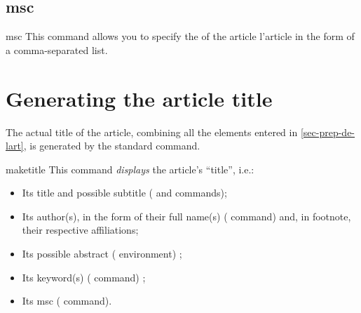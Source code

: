 \documentclass[english,nolocaltoc]{nwejmart}
\newtheorem[style=definition]{fact}
\newtheorem[title-plural=Criteria]{criterion}
\newtheorem[title=random experiment]{rexp}
\begin{document}
\begin{bodycode}[listing options={deletekeywords={[5]keywords}}]
\end{bodycode}

\subsection{\texorpdfstring{\acrfull{msc}}{MSC}}

\begin{docCommand}[doc description=\mandatory]{msc}{}
  This command allows you to specify the  of the article
  l'article in the form of a comma-separated list.
\end{docCommand}

\section{Generating the article title}
\label{sec-creation-du-titre}

The actual title of the article, combining all the elements entered in
\vref{sec-prep-de-lart}, is generated by the standard
 command.

\begin{docCommand}[doc description=\mandatory]{maketitle}{}
  This command  \emph{displays} the article's \enquote{title}, i.e.:
  \begin{itemize}
  \item Its title and possible subtitle ( and
     commands);
  \item Its author(s),  in the form of their full name(s)
    ( command) and, in footnote, their respective affiliations;
  \item Its possible abstract ( environment) ;
  \item Its keyword(s) ( command) ;
  \item Its \acrshort{msc} ( command).
  \end{itemize}
\end{docCommand}
\end{document}
